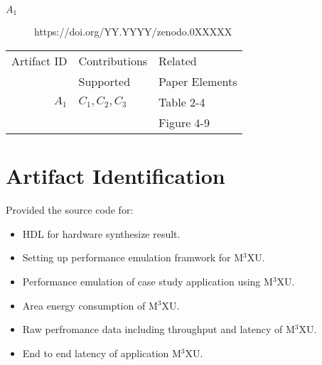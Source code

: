\documentclass[conference]{IEEEtran}
\newcommand{\MPCMXU}[1]{M$^{3}$XU}
\begin{document}
\begin{description}
\item[$A_1$] https://doi.org/YY.YYYY/zenodo.0XXXXX
\end{description}


\begin{center}
\begin{tabular}{rll}
\toprule
Artifact ID  &  Contributions &  Related \\
             &  Supported     &  Paper Elements \\
\midrule
$A_1$   &  $C_1,C_2,C_3$ & Table 2-4 \\
        &          & Figure 4-9\\
\bottomrule
\end{tabular}
\end{center}

\section{Artifact Identification}


\newartifact

\artrel
Provided the source code for:
\begin{itemize}
    \item HDL for hardware synthesize result.
    \item Setting up performance emulation framwork for \MPCMXU{}.
    \item Performance emulation of case study application using \MPCMXU{}.
\end{itemize}

\artexp
\begin{itemize}
    \item Area energy consumption of \MPCMXU{}.
    \item Raw perfromance data including throughput and latency of \MPCMXU{}.
    \item End to end latency of application \MPCMXU{}.
\end{itemize}
\end{document}
